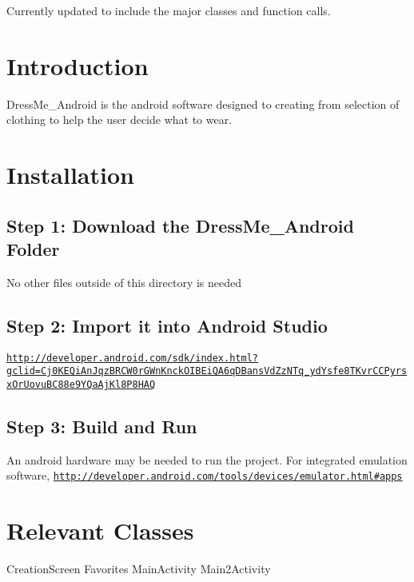 Currently updated to include the major classes and function calls.\hypertarget{index_intro_sec}{}\section{Introduction}\label{index_intro_sec}
Dress\+Me\+\_\+\+Android is the android software designed to creating from selection of clothing to help the user decide what to wear.\hypertarget{index_install_sec}{}\section{Installation}\label{index_install_sec}
\hypertarget{index_step1}{}\subsection{Step 1\+: Download the Dress\+Me\+\_\+\+Android Folder}\label{index_step1}
No other files outside of this directory is needed\hypertarget{index_step2}{}\subsection{Step 2\+: Import it into Android Studio}\label{index_step2}
\href{http://developer.android.com/sdk/index.html?gclid=Cj0KEQiAnJqzBRCW0rGWnKnckOIBEiQA6qDBansVdZzNTq_ydYsfe8TKvrCCPyrsxOrUovuBC88e9YQaAjKl8P8HAQ}{\tt http\+://developer.\+android.\+com/sdk/index.\+html?gclid=\+Cj0\+K\+E\+Qi\+An\+Jqz\+B\+R\+C\+W0r\+G\+Wn\+Knck\+O\+I\+B\+Ei\+Q\+A6q\+D\+Bans\+Vd\+Zz\+N\+Tq\+\_\+yd\+Ysfe8\+T\+Kvr\+C\+C\+Pyrsx\+Or\+Uovu\+B\+C88e9\+Y\+Qa\+Aj\+Kl8\+P8\+H\+A\+Q}\hypertarget{index_step3}{}\subsection{Step 3\+: Build and Run}\label{index_step3}
An android hardware may be needed to run the project. For integrated emulation software, \href{http://developer.android.com/tools/devices/emulator.html#apps}{\tt http\+://developer.\+android.\+com/tools/devices/emulator.\+html\#apps}\hypertarget{index_class_sec}{}\section{Relevant Classes}\label{index_class_sec}
Creation\+Screen Favorites Main\+Activity Main2\+Activity 